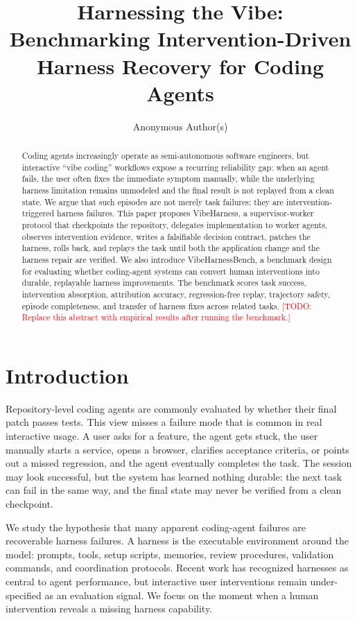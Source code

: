 \documentclass[11pt]{article}
\title{Harnessing the Vibe: Benchmarking Intervention-Driven Harness Recovery for Coding Agents}
\author{Anonymous Author(s)}
\date{}
\newcommand{\todo}[1]{\textcolor{red}{[TODO: #1]}}
\begin{document}
\maketitle

\begin{abstract}
Coding agents increasingly operate as semi-autonomous software engineers, but
interactive ``vibe coding'' workflows expose a recurring reliability gap: when an
agent fails, the user often fixes the immediate symptom manually, while the
underlying harness limitation remains unmodeled and the final result is not
replayed from a clean state. We argue that such episodes are not merely task
failures; they are intervention-triggered harness failures. This paper proposes
VibeHarness, a supervisor-worker protocol that checkpoints the repository,
delegates implementation to worker agents, observes intervention evidence,
writes a falsifiable decision contract, patches the harness, rolls back, and
replays the task until both the application change and the harness repair are
verified. We also introduce VibeHarnessBench, a benchmark design for evaluating
whether coding-agent systems can convert human interventions into durable,
replayable harness improvements. The benchmark scores task success,
intervention absorption, attribution accuracy, regression-free replay,
trajectory safety, episode completeness, and transfer of harness fixes across
related tasks.
\todo{Replace this abstract with empirical results after running the benchmark.}
\end{abstract}

\section{Introduction}

Repository-level coding agents are commonly evaluated by whether their final
patch passes tests. This view misses a failure mode that is common in real
interactive usage. A user asks for a feature, the agent gets stuck, the user
manually starts a service, opens a browser, clarifies acceptance criteria, or
points out a missed regression, and the agent eventually completes the task. The
session may look successful, but the system has learned nothing durable: the next
task can fail in the same way, and the final state may never be verified from a
clean checkpoint.

We study the hypothesis that many apparent coding-agent failures are recoverable
harness failures. A harness is the executable environment around the model:
prompts, tools, setup scripts, memories, review procedures, validation commands,
and coordination protocols. Recent work has recognized harnesses as central to
agent performance, but interactive user interventions remain under-specified as
an evaluation signal. We focus on the moment when a human intervention reveals a
missing harness capability.
\end{document}
